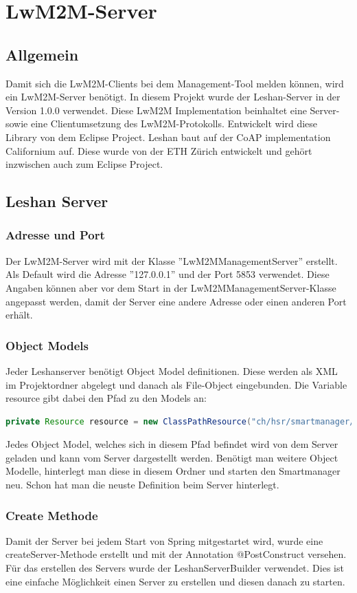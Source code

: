 \newpage

\section{LwM2M-Server}
\subsection{Allgemein}
Damit sich die LwM2M-Clients bei dem Management-Tool melden können, wird ein LwM2M-Server benötigt. In diesem Projekt wurde der Leshan-Server in der Version 1.0.0 verwendet. Diese LwM2M Implementation beinhaltet eine Server- sowie eine Clientumsetzung des LwM2M-Protokolls. Entwickelt wird diese Library von dem Eclipse Project. Leshan baut auf der CoAP implementation Californium auf. Diese wurde von der ETH Zürich entwickelt und  gehört inzwischen auch zum Eclipse Project.

\subsection{Leshan Server}
\subsubsection{Adresse und Port}
Der LwM2M-Server wird mit der Klasse ''LwM2MManagementServer'' erstellt. Als Default wird die Adresse ''127.0.0.1'' und der Port 5853 verwendet. Diese Angaben können aber vor dem Start in der LwM2MManagementServer-Klasse angepasst werden, damit der Server eine andere Adresse oder einen anderen Port erhält.
\subsubsection{Object Models}
Jeder Leshanserver benötigt Object Model definitionen. Diese werden als XML im Projektordner abgelegt und danach als File-Object eingebunden.
Die Variable resource gibt dabei den Pfad zu den Models an:
\begin{lstlisting}[language=java]
private Resource resource = new ClassPathResource("ch/hsr/smartmanager/resources/models/");
\end{lstlisting}
Jedes Object Model, welches sich in diesem Pfad befindet wird von dem Server geladen und kann vom Server dargestellt werden. Benötigt man weitere Object Modelle, hinterlegt man diese in diesem Ordner und starten den Smartmanager neu. Schon hat man die neuste Definition beim Server hinterlegt.
\subsubsection{Create Methode}
Damit der Server bei jedem Start von Spring mitgestartet wird, wurde eine createServer-Methode erstellt und mit der Annotation @PostConstruct versehen. Für das erstellen des Servers wurde der LeshanServerBuilder verwendet. Dies ist eine einfache Möglichkeit einen Server zu erstellen und diesen danach zu starten.

